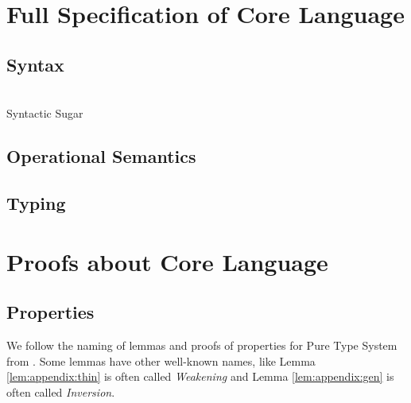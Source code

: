 \section{Full Specification of Core Language}

\subsection{Syntax}
\gram{\otte\ottinterrule
        \ottG\ottinterrule
        \ottv}
\\[2.0mm]
Syntactic Sugar\\
\resizebox{\columnwidth}{!}{$\ottcoresugar$} %

\subsection{Operational Semantics}
\ottdefnstep{}
\ottusedrule{\ottdruleSXXMu{}}

\subsection{Typing}
\ottdefnctx{}\ottinterrule
\ottdefnexpr{}
\ottusedrule{\ottdruleTXXMu{}}

\section{Proofs about Core Language}
\subsection{Properties}
We follow the naming of lemmas and proofs of properties 
for Pure Type System from \cite{handbook}. Some lemmas have other well-known names, like
Lemma \ref{lem:appendix:thin} is often called \emph{Weakening} and 
Lemma \ref{lem:appendix:gen} is often called \emph{Inversion}.

